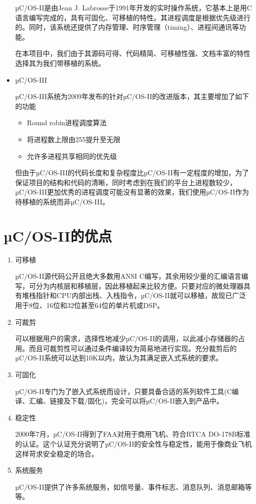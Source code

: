 \documentclass{ctexart}
\begin{document}
\begin{itemize}
    µC/OS-II是由Jean J. Labrosse于1991年开发的实时操作系统，它基本上是用C语言编写完成的，具有可固化、可移植的特性。其进程调度是根据优先级进行的。同时，该系统还提供了内存管理、时序管理（timing）、进程间通讯等功能。\par
    在本项目中，我们由于其源码可得、代码精简、可移植性强、文档丰富的特性选择其为我们带移植的系统。
  \item µC/OS-III\cite{noauthor_undated-vf}\par
    µC/OS-III系统为2009年发布的针对µC/OS-II的改进版本，其主要增加了如下的功能
    \begin{itemize}
      \item Round robin进程调度算法
      \item 将进程数上限由255提升至无限
      \item 允许多进程共享相同的优先级
    \end{itemize}
    但由于µC/OS-III的代码长度和复杂程度比µC/OS-II有一定程度的增加，为了保证项目的结构和代码的清晰，同时考虑到在我们的平台上进程数较少，µC/OS-III更加优秀的进程调度可能没有显著的效果，我们使用µC/OS-II作为待移植的系统而非µC/OS-III。
\end{itemize}

\section{µC/OS-II的优点}

\begin{enumerate}
  \item 可移植\par
    µC/OS-II源代码公开且绝大多数用ANSI C编写，其余用较少量的汇编语言编写，可分为内核层和移植层，因此移植起来比较方便。只要对应的微处理器具有堆栈指针和CPU内部出栈、入栈指令，µC/OS-II就可以移植，故现已广泛用于8位、16位和32位甚至64位的单片机或DSP。
  \item 可裁剪\par
    可以根据用户的需求，选择性地减少µC/OS-II的调用，以此减小存储器的占用。而且可裁剪性可以通过条件编译较为简易地进行实现。充分裁剪后的µC/OS-II系统可以达到10K以内，故认为其满足嵌入式系统的要求。
  \item 可固化\par
    µC/OS-II专门为了嵌入式系统而设计，只要具备合适的系列软件工具(C编译、汇编、链接及下载/固化)，完全可以将µC/OS-II嵌入到产品中。
  \item 稳定性\par
    2000年7月，µC/OS-II得到了FAA对用于商用飞机、符合RTCA DO-178B标准的认证。这个认证充分说明了µC/OS-II的安全性与稳定性，能用于像商业飞机这样苛求安全稳定的场合。
  \item 系统服务\par
    µC/OS-II提供了许多系统服务，如信号量、事件标志、消息队列、消息邮箱等等。
\end{enumerate}
\end{document}
